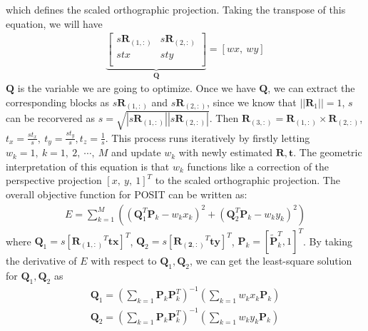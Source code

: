 \documentclass[a4paper]{article}
\begin{document}
which defines the scaled orthographic projection. Taking the transpose of this equation, we will have
\begin{align*}
[X,\ Y,\ Z,\ 1]
\underbrace{\left[
\begin{matrix}
s\mathbf{R}_{(1,:)} & s\mathbf{R}_{(2,:)} \\ 
stx & sty \\ 
\end{matrix}
\right]}_{\mathbf{Q}}=[wx,\ wy]
\end{align*}
$\mathbf{Q}$ is the variable we are going to optimize. Once we have $\mathbf{Q}$, we can extract the corresponding blocks as $s\mathbf{R}_{(1,:)}$ and $s\mathbf{R}_{(2,:)}$, since we know that $||\mathbf{R}_1||=1$, $s$ can be recorvered as $s=\sqrt{|s\mathbf{R}_{(1,:)}||s\mathbf{R}_{(2,:)}|}$. Then $\mathbf{R}_{(3,:)}=\mathbf{R}_{(1,:)} \times \mathbf{R}_{(2,:)}$, $t_x = \frac{st_x}{s},\ t_y=\frac{st_y}{s}, t_z=\frac{1}{s}$. This process runs iteratively by firstly letting $w_k=1,\ k=1,\ 2,\ \cdots,\ M$ and update $w_k$ with newly estimated $\mathbf{R}, \mathbf{t}$. The geometric interpretation of this equation is that $w_k$ functions like a correction of the perspective projection $[x,\ y,\ 1]^T$ to the scaled orthographic projection. The overall objective function for POSIT can be written as:
\begin{align*}
E=\sum_{k=1}^{M}\left(
\left(
\mathbf{Q}_1^T \mathbf{P}_k - w_kx_k
\right)^2+
\left(
\mathbf{Q}_2^T \mathbf{P}_k - w_ky_k
\right)^2
\right)
\end{align*}
where $\mathbf{Q}_1=s[\mathbf{R_{(1,:)}}^T \mathbf{tx}]^T$, $\mathbf{Q}_2=s[\mathbf{R_{(2,:)}}^T \mathbf{ty}]^T$, $\mathbf{P}_k=[\tilde{\mathbf{P}}_k^T, 1]^T$. By taking the derivative of $E$ with respect to $\mathbf{Q}_1, \mathbf{Q}_2$, we can get the least-square solution for $\mathbf{Q}_1, \mathbf{Q}_2$ as
\begin{align*}
\mathbf{Q}_1=\left(
\sum_{k=1}\mathbf{P}_k\mathbf{P}_k^T
\right)^{-1}\left(
\sum_{k=1} w_kx_k\mathbf{P}_k
\right) \\
\mathbf{Q}_2=\left(
\sum_{k=1}\mathbf{P}_k\mathbf{P}_k^T
\right)^{-1}\left(
\sum_{k=1} w_ky_k\mathbf{P}_k
\right)
\end{align*}
\end{document}
